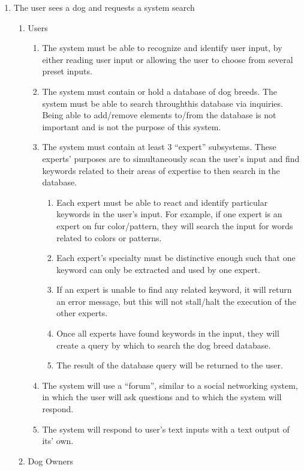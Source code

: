 \documentclass[]{article}
\begin{document}
\begin{enumerate}[{BE}1.]
	\item The user sees a dog and requests a system search
	\begin{enumerate}[{VP1}.1]
		\item Users
			\begin{enumerate}
				\item The system must be able to recognize and identify user input, by either reading user input or allowing the user to choose from several preset inputs.
				\item The system must contain or hold a database of dog breeds. The system must be able to search throughthis database via inquiries. Being able to add/remove elements to/from the database is not important and is not the purpose of this system.
				\item The system must contain at least 3 “expert” subsystems. These experts’ purposes are to simultaneously scan the user’s input and find keywords related to their areas of expertise to then search in the database.
                \begin{enumerate}[{iii}.i]
                \item Each expert must be able to react and identify particular keywords in the user’s input. For example, if one expert is an expert on fur color/pattern, they will search the input for words related to colors or patterns.
                \item Each expert’s specialty must be distinctive enough such that one keyword can only be extracted and used by one expert.
				\item If an expert is unable to find any related keyword, it will return an error message, but this will not stall/halt the execution of the other experts.
				\item Once all experts have found keywords in the input, they will create a query by which to search the dog breed database.
				\item The result of the database query will be returned to the user.
                \end{enumerate}
                \item The system will use a “forum”, similar to a social networking system, in which the user will ask questions and to which the system will respond.
				\item The system will respond to user’s text inputs with a text output of its’ own.
			\end{enumerate}
		\item Dog Owners

\end{enumerate}
\end{enumerate}
\end{document}
